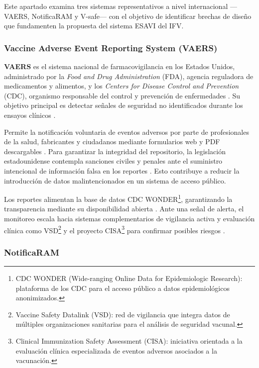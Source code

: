 Este apartado examina tres sistemas representativos a nivel internacional —VAERS, NotificaRAM y V-safe— con el objetivo de identificar brechas de diseño que fundamenten la propuesta del sistema ESAVI del IFV.

\subsubsection{Vaccine Adverse Event Reporting System (VAERS)}

\textbf{VAERS} es el sistema nacional de farmacovigilancia en los Estados Unidos, administrado por la \textit{Food and Drug Administration} (FDA), agencia reguladora de medicamentos y alimentos, y los \textit{Centers for Disease Control and Prevention} (CDC), organismo responsable del control y prevención de enfermedades \cite{fda_vaers}. 
Su objetivo principal es detectar señales de seguridad no identificados durante los ensayos clínicos \cite{cdc_vaers}.

Permite la notificación voluntaria de eventos adversos por parte de profesionales de la salud, fabricantes y ciudadanos mediante formularios web y PDF descargables \cite{vaers_official}.
Para garantizar la integridad del repositorio, la legislación estadounidense contempla sanciones civiles y penales ante el suministro intencional de información falsa en los reportes \cite{vaers_official}. 
Esto contribuye a reducir la introducción de datos malintencionados en un sistema de acceso público.

Los reportes alimentan la base de datos CDC WONDER\footnote{CDC WONDER (Wide-ranging Online Data for Epidemiologic Research): plataforma de los CDC para el acceso público a datos epidemiológicos anonimizados.}, garantizando la transparencia mediante su disponibilidad abierta \cite{vaers_official}. 
Ante una señal de alerta, el monitoreo escala hacia sistemas complementarios de vigilancia activa y evaluación clínica como VSD\footnote{Vaccine Safety Datalink (VSD): red de vigilancia que integra datos de múltiples organizaciones sanitarias para el análisis de seguridad vacunal.} y el proyecto CISA\footnote{Clinical Immunization Safety Assessment (CISA): iniciativa orientada a la evaluación clínica especializada de eventos adversos asociados a la vacunación.} para confirmar posibles riesgos \cite{cdc_vaers}.

\subsubsection{NotificaRAM}

